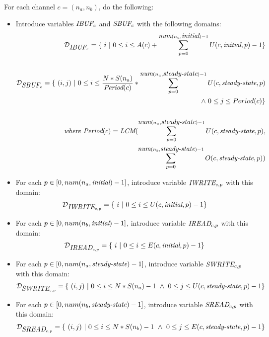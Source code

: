 For each channel $c = (n_a, n_b)$, do the following:
\begin{itemize}

\item Introduce variables $\mbox{\it IBUF}_c$ and $\mbox{\it SBUF}_c$ with the following domains:
\begin{align*}
{\cal D}_{\mt{IBUF}_c} = \{~i~|~0 \le i \le A(c) +
\sum_{p=0}^{\mt{num}(n_a, \mt{initial})-1} U(c, \mt{initial}, p) - 1\} \\ ~ \\
%
{\cal D}_{\mt{SBUF}_c} = \{~(i,j)~|~0 \le i \le \frac{N *
S(n_a)}{\mt{Period}(c)} * \sum_{p=0}^{\mt{num}(n_a,
\mt{steady-state})-1} U(c, \mt{steady-state}, p) \\
\wedge~0 \le j \le Period(c) \} \\ ~ \\
%
\mt{where Period}(c) = \mt{LCM}(\sum_{p=0}^{\mt{num}(n_a,
\mt{steady-state})-1} U(c, \mt{steady-state}, p), \\
\sum_{p=0}^{\mt{num}(n_b, \mt{steady-state})-1} O(c,
\mt{steady-state}, p)) \\
\end{align*}

\item For each $p \in [0, num(n_a, \mbox{\it initial})-1]$, introduce
variable $\mbox{\it IWRITE}_{c, p}$ with this domain:
\begin{align*}
{\cal D}_{\mbox{\it IWRITE}_{c, p}} = \{~i~|~0 \le i \le U(c, \mbox{\it initial}, p) - 1\} \\
\end{align*}

\item For each $p \in [0, num(n_b, \mbox{\it initial})-1]$, introduce
variable $\mbox{\it IREAD}_{c, p}$ with this domain:
\begin{align*}
{\cal D}_{\mbox{\it IREAD}_{c, p}} = \{~i~|~0 \le i \le E(c, \mbox{\it initial}, p) - 1\} \\
\end{align*}

\item For each $p \in [0, num(n_a, \mbox{\it steady-state})-1]$, introduce
variable $\mbox{\it SWRITE}_{c, p}$ with this domain:
\begin{align*}
{\cal D}_{\mbox{\it SWRITE}_{c, p}} = \{~(i,j)~|~0 \le i \le N * S(n_a) - 1 ~\wedge~ 0 \le j \le U(c, \mbox{\it steady-state}, p) - 1\} \\
\end{align*}

\item For each $p \in [0, num(n_b, \mbox{\it steady-state})-1]$, introduce
variable $\mbox{\it SREAD}_{c, p}$ with this domain:
\begin{align*}
{\cal D}_{\mbox{\it SREAD}_{c, p}} = \{~(i,j)~|~0 \le i \le N * S(n_b) - 1 ~\wedge~ 0 \le j \le E(c, \mbox{\it steady-state}, p) - 1\} \\
\end{align*}


\end{itemize}

